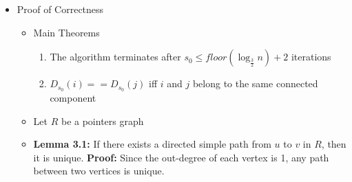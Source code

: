 \documentclass[a4paper]{article}
\begin{document}
\begin{itemize}
\begin{itemize}
\begin{lstlisting}
Step 4:
  if $ i \leq n$
  then $D_s(i) = D_s(D_s(i))$ (second collapsing)
  
Step 5:
  $s = s + 1$
  if $i \leq n$ and $Q(i) == s$ (if vertex is not stagnant)
  then $s' = s' + 1$
         
\end{lstlisting} 

\item Note that the algorithm is somewhat confusing in regards to when edge processors terminate. Notice that the initialization phase only causes vertex processors to set $s'$ and $s$ at all, my guess is that edge processors continue to execute until all trees are stagnant?

\item Notice that one of the reasons we need a processor for both edge ordered pairs $(i, j)$ and $(j, i)$ is so that both directions of the edges will be checked in steps 2 and 3 above

\item Also notice that for the hooking steps (2 and 3), multiple processors for vertices pointing to the same root will be trying to simultaneously hook the root on different trees. One wins, and we don't care which

\item As soon as all trees are stagnated, the algorithm will terminate

\item Synchronization is required before each line of the program

\end{itemize}

\item Proof of Correctness
\begin{itemize}
\item Main Theorems
\begin{enumerate}
\item The algorithm terminates after $s_0 \leq floor(\log_{\frac{3}{2}} n) + 2$ iterations

\item $D_{s_0}(i) == D_{s_0}(j)$ iff $i$ and $j$ belong to the same connected component
\end{enumerate}

\item Let $R$ be a pointers graph

\item \textbf{Lemma 3.1:} If there exists a directed simple path from $u$ to $v$ in $R$, then it is unique. \textbf{Proof:} Since the out-degree of each vertex is 1, any path between two vertices is unique.


\end{itemize}
\end{itemize}
\end{document}
